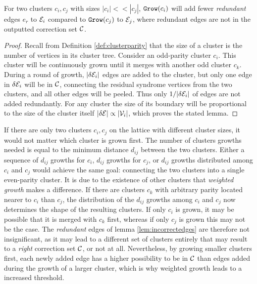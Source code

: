 
\begin{lemma}\label{lem:incorrectedges}
  For two clusters $c_i, c_j$ with sizes $|c_i| << |c_j|$, $\texttt{Grow}(c_i)$ will add fewer \emph{redundant} edges $e_r$ to $\mathcal{E}_i$ compared to $\texttt{Grow}(c_j)$ to $\mathcal{E}_j$, where redundant edges are not in the outputted correction set $\mathcal{C}$. 
\end{lemma}
\begin{proof}
  Recall from Definition \ref{def:clusterparity} that the size of a cluster is the number of vertices in its cluster tree. Consider an odd-parity cluster $c_i$. This cluster will be continuously grown until it merges with another odd cluster $c_k$. During a round of growth, $|\delta \mathcal{E}_i|$ edges are added to the cluster, but only one edge in $\delta \mathcal{E}_i$ will be in $\mathcal{C}$, connecting the residual syndrome vertices from the two clusters, and all other edges will be peeled. Thus only $1/|\delta \mathcal{E}_i|$ of edges are not added redundantly. For any cluster the size of its boundary will be proportional to the size of the cluster itself $|\delta \mathcal{E}| \propto |\mathcal{V}_i|$, which proves the stated lemma. 
\end{proof}

If there are only two clusters $c_i, c_j$ on the lattice with different cluster sizes, it would not matter which cluster is grown first. The number of clusters growths needed is equal to the minimum distance $d_{ij}$ between the two clusters. Either a sequence of $d_{ij}$ growths for $c_i$, $d_{ij}$ growths for $c_j$, or $d_{ij}$ growths distributed among $c_i$ and $c_j$ would achieve the same goal: connecting the two clusters into a single even-parity cluster. It is due to the existence of other clusters that \emph{weighted growth} makes a difference. If there are clusters $c_k$ with arbitrary parity located nearer to $c_i$ than $c_j$, the distribution of the $d_{ij}$ growths among $c_i$ and $c_j$ now determines the shape of the resulting clusters. If only $c_i$ is grown, it may be possible that it is merged with $c_k$ first, whereas if only $c_j$ is grown this may not be the case. The \emph{redundant} edges of lemma \ref{lem:incorrectedges} are therefore not insignificant, as it may lead to a different set of clusters entirely that may result to a \emph{right} correction set $\mathcal{C}$, or not at all. Nevertheless, by growing smaller clusters first, each newly added edge has a higher possibility to be in $\mathcal{C}$ than edges added during the growth of a larger cluster, which is why weighted growth leads to a increased threshold.


